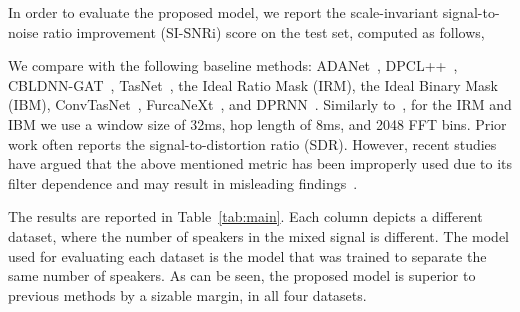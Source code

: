 \documentclass{article}
\begin{document}
In order to evaluate the proposed model, we report the scale-invariant signal-to-noise ratio improvement (SI-SNRi) score on the test set, computed as follows,


We compare with the following baseline methods: ADANet~\cite{luo2018speaker}, DPCL++~\cite{isik2016single}, CBLDNN-GAT~\cite{li2018cbldnn}, TasNet~\cite{luo2018tasnet}, the Ideal Ratio Mask (IRM), the Ideal Binary Mask (IBM), ConvTasNet~\cite{luo2019conv}, FurcaNeXt~\cite{zhang2020furcanext}, and DPRNN~\cite{luo2019dual}. Similarly to~\citet{luo2019conv}, for the IRM and IBM we use a window size of 32ms, hop length of 8ms, and 2048 FFT bins. Prior work often reports the signal-to-distortion ratio (SDR). However, recent studies have argued that the above mentioned metric has been improperly used due to its filter dependence and may result in misleading findings~\cite{le2019sdr}. 

The results are reported in Table~\ref{tab:main}. Each column depicts a different dataset, where the number of speakers  in the mixed signal  is different. The model used for evaluating each dataset is the model that was trained to separate the same number of speakers. As can be seen, the proposed model is superior to previous methods by a sizable margin, in all four datasets.

\begin{table}[t]
    \centering
    \caption{Performance of various models as a function of the number of speakers. Starred results (*) mark our training, using published code by the method's authors. The other baselines are obtained from the respective papers.}
    \label{tab:main}
\end{table}
\end{document}
